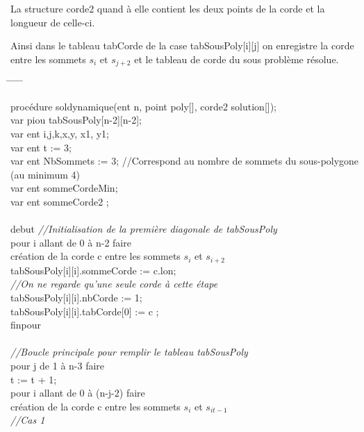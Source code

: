 \documentclass[a4paper,10pt]{article}
\begin{document}
La structure corde2 quand à elle contient les deux points de la corde et la longueur de celle-ci.

Ainsi dans le tableau tabCorde de la case tabSousPoly[i][j] on enregistre la corde entre les sommets \(s_i\) et \(s_{j+2}\) et le tableau de  corde du sous problème résolue.
  
\begin{tabbing}
\hspace{0.4cm} \= \hspace{0.4cm}  \= \hspace{0.4cm} \= \hspace{0.4cm} \= \hspace{0.4cm} \= \kill

procédure soldynamique(ent n, point poly[], corde2 solution[]); \\
var piou tabSousPoly[n-2][n-2]; \\
var ent i,j,k,x,y, x1, y1; \\
var ent t := 3; \\
var ent NbSommets := 3; //Correspond au nombre de sommets du sous-polygone (au minimum 4) \\
var ent sommeCordeMin; \\
var ent sommeCorde2 ; \\
\\
debut
\textit{//Initialisation de la première diagonale de tabSousPoly}\\
pour i allant de 0 à n-2 faire\\
  \> création de la corde c entre les sommets \(s_i\) et \(s_{i+2}\) \\
  \> tabSousPoly[i][i].sommeCorde := c.lon; \\
  \> \textit{//On ne regarde qu'une seule corde à cette étape} \\
  \> tabSousPoly[i][i].nbCorde := 1; \\
  \> tabSousPoly[i][i].tabCorde[0] := c ; \\
finpour\\
\\
\textit{//Boucle principale pour remplir le tableau tabSousPoly }\\
pour j de 1 à n-3 faire\\
    \> t := t + 1;\\ 
    \> pour i allant de 0 à (n-j-2) faire\\
	\> \> création de la corde c entre les sommets \(s_i\) et \(s_{it-1}\) \\
\> \> \textit{//Cas 1} \\

\end{tabbing}
\end{document}

